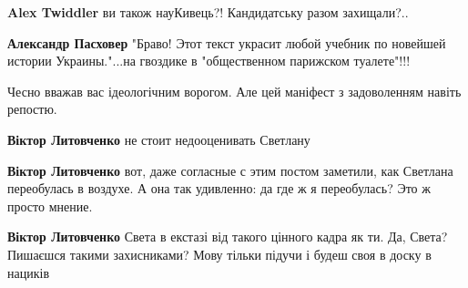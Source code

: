 \begin{itemize}
\begin{itemize}
 
\textbf{Alex Twiddler} ви також науКивець?! Кандидатську разом захищали?..

 
\textbf{Александр Пасховер} "Браво! Этот текст украсит любой учебник по новейшей истории Украины."...на гвоздике в "общественном парижском туалете"!!!
\end{itemize}

 

Чесно вважав вас ідеологічним ворогом. Але цей маніфест з задоволенням навіть репостю.

\begin{itemize}
 
\textbf{Віктор Литовченко} не стоит недооценивать Светлану \Smiley[1.0][yellow]

 
\textbf{Віктор Литовченко} вот, даже согласные с этим постом заметили, как Светлана переобулась в воздухе. А она так удивленно: да где ж я переобулась? Это ж просто мнение.

 
\textbf{Віктор Литовченко} Света в екстазі від такого цінного кадра як ти. Да, Света? Пишаєшся такими захисниками? Мову тільки підучи і будеш своя в доску в нациків🤣


\end{itemize}
\end{itemize}

